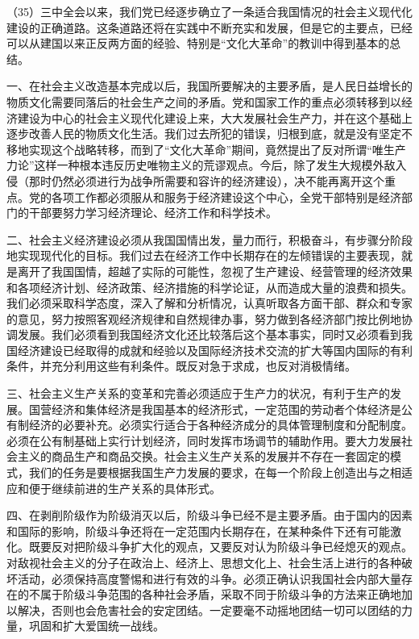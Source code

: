 （35）三中全会以来，我们党已经逐步确立了一条适合我国情况的社会主义现代化建设的正确道路。这条道路还将在实践中不断充实和发展，但是它的主要点，已经可以从建国以来正反两方面的经验、特别是“文化大革命”的教训中得到基本的总结。

一、在社会主义改造基本完成以后，我国所要解决的主要矛盾，是人民日益增长的物质文化需要同落后的社会生产之间的矛盾。党和国家工作的重点必须转移到以经济建设为中心的社会主义现代化建设上来，大大发展社会生产力，并在这个基础上逐步改善人民的物质文化生活。我们过去所犯的错误，归根到底，就是没有坚定不移地实现这个战略转移，而到了“文化大革命”期间，竟然提出了反对所谓“唯生产力论”这样一种根本违反历史唯物主义的荒谬观点。今后，除了发生大规模外敌入侵（那时仍然必须进行为战争所需要和容许的经济建设），决不能再离开这个重点。党的各项工作都必须服从和服务于经济建设这个中心，全党干部特别是经济部门的干部要努力学习经济理论、经济工作和科学技术。

二、社会主义经济建设必须从我国国情出发，量力而行，积极奋斗，有步骤分阶段地实现现代化的目标。我们过去在经济工作中长期存在的左倾错误的主要表现，就是离开了我国国情，超越了实际的可能性，忽视了生产建设、经营管理的经济效果和各项经济计划、经济政策、经济措施的科学论证，从而造成大量的浪费和损失。我们必须采取科学态度，深入了解和分析情况，认真听取各方面干部、群众和专家的意见，努力按照客观经济规律和自然规律办事，努力做到各经济部门按比例地协调发展。我们必须看到我国经济文化还比较落后这个基本事实，同时又必须看到我国经济建设已经取得的成就和经验以及国际经济技术交流的扩大等国内国际的有利条件，并充分利用这些有利条件。既反对急于求成，也反对消极情绪。

三、社会主义生产关系的变革和完善必须适应于生产力的状况，有利于生产的发展。国营经济和集体经济是我国基本的经济形式，一定范围的劳动者个体经济是公有制经济的必要补充。必须实行适合于各种经济成分的具体管理制度和分配制度。必须在公有制基础上实行计划经济，同时发挥市场调节的辅助作用。要大力发展社会主义的商品生产和商品交换。社会主义生产关系的发展并不存在一套固定的模式，我们的任务是要根据我国生产力发展的要求，在每一个阶段上创造出与之相适应和便于继续前进的生产关系的具体形式。

四、在剥削阶级作为阶级消灭以后，阶级斗争已经不是主要矛盾。由于国内的因素和国际的影响，阶级斗争还将在一定范围内长期存在，在某种条件下还有可能激化。既要反对把阶级斗争扩大化的观点，又要反对认为阶级斗争已经熄灭的观点。对敌视社会主义的分子在政治上、经济上、思想文化上、社会生活上进行的各种破坏活动，必须保持高度警惕和进行有效的斗争。必须正确认识我国社会内部大量存在的不属于阶级斗争范围的各种社会矛盾，采取不同于阶级斗争的方法来正确地加以解决，否则也会危害社会的安定团结。一定要毫不动摇地团结一切可以团结的力量，巩固和扩大爱国统一战线。

